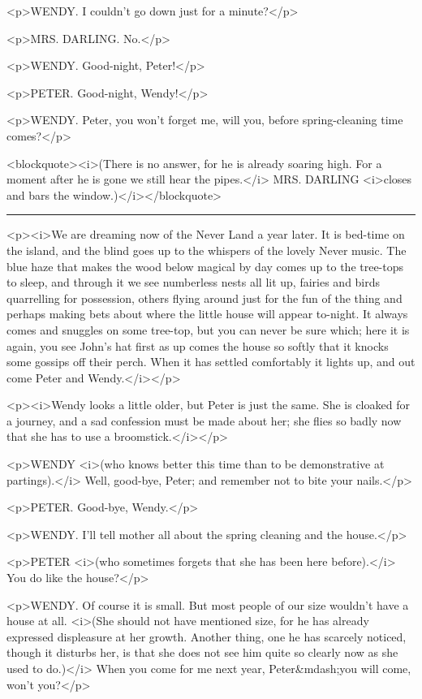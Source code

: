 <p>WENDY. I couldn't go down just for a minute?</p>

<p>MRS. DARLING. No.</p>

<p>WENDY. Good-night, Peter!</p>

<p>PETER. Good-night, Wendy!</p>

<p>WENDY. Peter, you won't forget me, will you, before spring-cleaning time comes?</p>

<blockquote><i>(There is no answer, for he is already soaring high. For a moment after he is gone we still hear the pipes.</i> MRS. DARLING <i>closes and bars the window.)</i></blockquote>

\plainbreak{1}

<p><i>We are dreaming now of the Never Land a year later. It is bed-time on the island, and the blind goes up to the whispers of the lovely Never music. The blue haze that makes the wood below magical by day comes up to the tree-tops to sleep, and through it we see numberless nests all lit up, fairies and birds quarrelling for possession, others flying around just for the fun of the thing and perhaps making bets about where the little house will appear to-night. It always comes and snuggles on some tree-top, but you can never be sure which; here it is again, you see John's hat first as up comes the house so softly that it knocks some gossips off their perch. When it has settled comfortably it lights up, and out come Peter and Wendy.</i></p>

<p><i>Wendy looks a little older, but Peter is just the same. She is cloaked for a journey, and a sad confession must be made about her; she flies so badly now that she has to use a broomstick.</i></p>

<p>WENDY <i>(who knows better this time than to be demonstrative at partings).</i> Well, good-bye, Peter; and remember not to bite your nails.</p>

<p>PETER. Good-bye, Wendy.</p>

<p>WENDY. I'll tell mother all about the spring cleaning and the house.</p>

<p>PETER <i>(who sometimes forgets that she has been here before).</i> You do like the house?</p>

<p>WENDY. Of course it is small. But most people of our size wouldn't have a house at all. <i>(She should not have mentioned size, for he has already expressed displeasure at her growth. Another thing, one he has scarcely noticed, though it disturbs her, is that she does not see him quite so clearly now as she used to do.)</i> When you come for me next year, Peter&mdash;you will come, won't you?</p>


